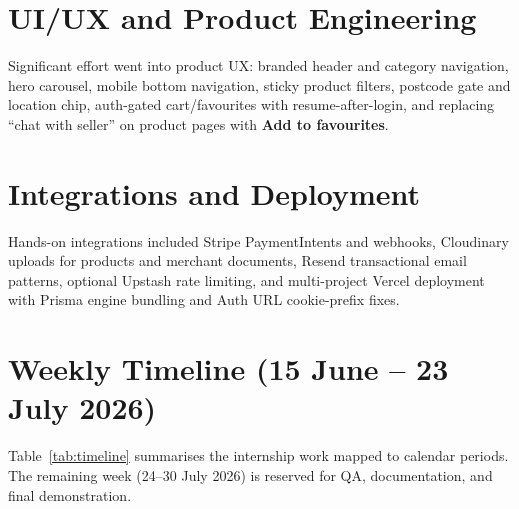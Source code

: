 \documentclass[12pt,a4paper]{report}
\begin{document}
\section{UI/UX and Product Engineering}

Significant effort went into product UX: branded header and category navigation,
hero carousel, mobile bottom navigation, sticky product filters, postcode gate
and location chip, auth-gated cart/favourites with resume-after-login, and
replacing ``chat with seller'' on product pages with \textbf{Add to favourites}.

\section{Integrations and Deployment}

Hands-on integrations included Stripe PaymentIntents and webhooks, Cloudinary
uploads for products and merchant documents, Resend transactional email
patterns, optional Upstash rate limiting, and multi-project Vercel deployment
with Prisma engine bundling and Auth URL cookie-prefix fixes.

\section{Weekly Timeline (15 June -- 23 July 2026)}

Table~\ref{tab:timeline} summarises the internship work mapped to calendar
periods. The remaining week (24--30 July 2026) is reserved for QA, documentation,
and final demonstration.
\end{document}
